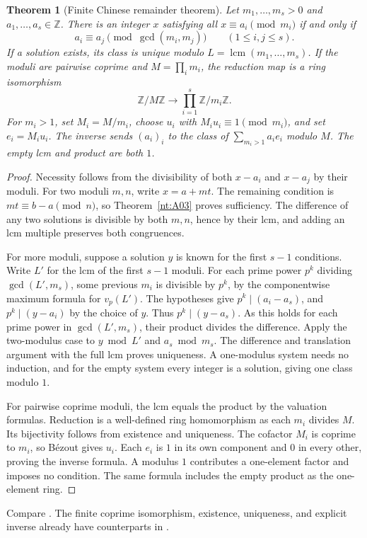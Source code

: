 \documentclass[11pt,oneside,openany]{book}
\theoremstyle{plain}
\newtheorem{theorem}{Theorem}[chapter]
\theoremstyle{definition}
\theoremstyle{remark}
\begin{document}
\begin{theorem}[Finite Chinese remainder theorem]\label{nt:A05}
Let $m_1,\ldots,m_s>0$ and $a_1,\ldots,a_s\in\mathbb Z$. There is
an integer $x$ satisfying all $x\equiv a_i\pmod{m_i}$ if and only
if
\[
 a_i\equiv a_j\pmod{\gcd(m_i,m_j)}\qquad(1\le i,j\le s).
\]
If a solution exists, its class is unique modulo
$L=\operatorname{lcm}(m_1,\ldots,m_s)$. If the moduli are pairwise
coprime and $M=\prod_i m_i$, the reduction map is a ring
isomorphism
\[
 \mathbb Z/M\mathbb Z \longrightarrow
     \prod_{i=1}^s \mathbb Z/m_i\mathbb Z.
\]
For $m_i>1$, set $M_i=M/m_i$, choose $u_i$ with
$M_i u_i\equiv1\pmod{m_i}$, and set $e_i=M_i u_i$. The inverse
sends $(a_i)_i$ to the class of $\sum_{m_i>1}a_i e_i$ modulo $M$.
The empty lcm and product are both $1$.
\end{theorem}
\begin{proof}
Necessity follows from the divisibility of both $x-a_i$ and
$x-a_j$ by their moduli. For two moduli $m,n$, write $x=a+mt$.
The remaining condition is $mt\equiv b-a\pmod n$, so
Theorem~\ref{nt:A03} proves sufficiency. The difference of any
two solutions is divisible by both $m,n$, hence by their lcm,
and adding an lcm multiple preserves both congruences.

For more moduli, suppose a solution $y$ is known for the first
$s-1$ conditions. Write $L'$ for the lcm of the first $s-1$
moduli. For each prime power $p^k$ dividing $\gcd(L',m_s)$, some
previous $m_i$ is divisible by $p^k$, by the componentwise maximum
formula for $v_p(L')$. The hypotheses give $p^k\mid(a_i-a_s)$,
and $p^k\mid(y-a_i)$ by the choice of $y$. Thus $p^k\mid(y-a_s)$.
As this holds for each prime power in $\gcd(L',m_s)$, their product
divides the difference. Apply the two-modulus case to
$y\bmod L'$ and $a_s\bmod m_s$. The difference and translation
argument with the full lcm proves uniqueness. A one-modulus
system needs no induction, and for the empty system every
integer is a solution, giving one class modulo $1$.

For pairwise coprime moduli, the lcm equals the product by the
valuation formulas. Reduction is a well-defined ring homomorphism
as each $m_i$ divides $M$. Its bijectivity follows from existence
and uniqueness. The cofactor $M_i$ is coprime to $m_i$, so
B\'ezout gives $u_i$. Each $e_i$ is $1$ in its own component
and $0$ in every other, proving the inverse formula. A modulus
$1$ contributes a one-element factor and imposes no condition.
The same formula includes the empty product as the one-element
ring.
\end{proof}
Compare \cite[Thm.~5.26]{apostol}. The finite coprime isomorphism,
existence, uniqueness, and explicit inverse already have
counterparts in \cite[D07, Ch.~9]{mathgenome}.
\end{document}

